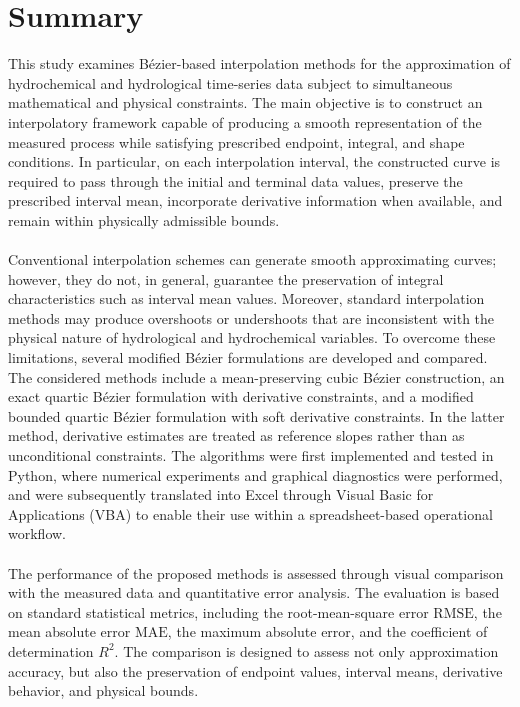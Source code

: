 \documentclass[12pt,a4paper]{article}
\begin{document}
\newpage
\section*{Summary}

This study examines B\'ezier-based interpolation methods for the approximation of hydrochemical and hydrological time-series data subject to simultaneous mathematical and physical constraints. The main objective is to construct an interpolatory framework capable of producing a smooth representation of the measured process while satisfying prescribed endpoint, integral, and shape conditions. In particular, on each interpolation interval, the constructed curve is required to pass through the initial and terminal data values, preserve the prescribed interval mean, incorporate derivative information when available, and remain within physically admissible bounds.
\\
\\Conventional interpolation schemes can generate smooth approximating curves; however, they do not, in general, guarantee the preservation of integral characteristics such as interval mean values. Moreover, standard interpolation methods may produce overshoots or undershoots that are inconsistent with the physical nature of hydrological and hydrochemical variables. To overcome these limitations, several modified B\'ezier formulations are developed and compared. The considered methods include a mean-preserving cubic B\'ezier construction, an exact quartic B\'ezier formulation with derivative constraints, and a modified bounded quartic B\'ezier formulation with soft derivative constraints. In the latter method, derivative estimates are treated as reference slopes rather than as unconditional constraints. The algorithms were first implemented and tested in Python, where numerical experiments and graphical diagnostics were performed, and were subsequently translated into Excel through Visual Basic for Applications (VBA) to enable their use within a spreadsheet-based operational workflow.
\\
\\The performance of the proposed methods is assessed through visual comparison with the measured data and quantitative error analysis. The evaluation is based on standard statistical metrics, including the root-mean-square error \(\mathrm{RMSE}\), the mean absolute error \(\mathrm{MAE}\), the maximum absolute error, and the coefficient of determination \(R^2\). The comparison is designed to assess not only approximation accuracy, but also the preservation of endpoint values, interval means, derivative behavior, and physical bounds.
\end{document}
